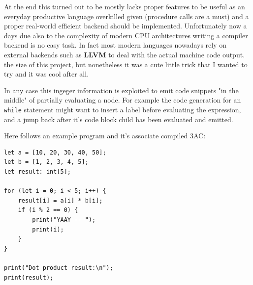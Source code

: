 \documentclass[a4paper]{article}
\begin{document}
At the end this turned out to be mostly lacks proper features to be useful as an everyday productive language overkilled given (procedure calls are a must)
and a proper real-world efficient backend should be implemented. Unfortunately now a days due also to the complexity
of modern CPU architectures writing a compiler backend is no easy task. In fact most modern languages
nowadays rely on external backends such as \textbf{LLVM} to deal with the actual machine code output.
the size of this project, but nonetheless it was a cute little trick that I wanted to try and it was cool
after all.

In any case this ingeger information is exploited to emit code snippets "in the middle" of partially evaluating a node. For
example the code generation for an \texttt{while} statement might want to insert a label before evaluating the expression,
and a jump back after it's code block child has been evaluated and emitted.

Here follows an example program and it's associate compiled 3AC:

\begin{lstlisting}[language=DPL]
let a = [10, 20, 30, 40, 50];
let b = [1, 2, 3, 4, 5];
let result: int[5];

for (let i = 0; i < 5; i++) {
    result[i] = a[i] * b[i];
    if (i % 2 == 0) {
        print("YAAY -- ");
        print(i);
    }
}

print("Dot product result:\n");
print(result);
\end{lstlisting}
\end{document}
